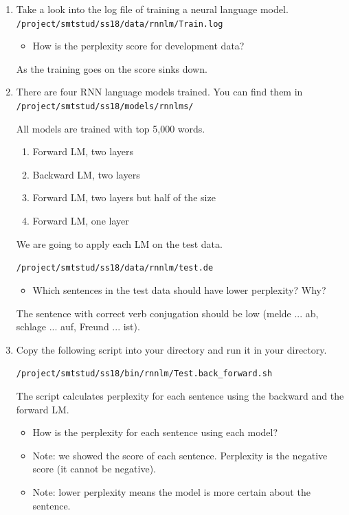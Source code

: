\documentclass[12pt,fleqn]{article}
\begin{document}
\begin{enumerate} 

\item Take a look into the log file of training a neural language model. \\ 
\texttt{/project/smtstud/ss18/data/rnnlm/Train.log} \\ 

\begin{itemize} 
 \item How is the perplexity score for development data? 
\end{itemize}

As the training goes on the score sinks down. 

\item There are four RNN language models trained. You can find them in \\ 
\texttt{/project/smtstud/ss18/models/rnnlms/} 

All models are trained with top 5,000 words. 
\begin{enumerate} 
 \item Forward LM, two layers 
 \item Backward LM, two layers 
 \item Forward LM, two layers but half of the size  
 \item Forward LM, one layer 
\end{enumerate}

We are going to apply each LM on the test data. 

\texttt{/project/smtstud/ss18/data/rnnlm/test.de} \\ 

\begin{itemize} 
 \item Which sentences in the test data should have lower perplexity? Why? 
\end{itemize}

The sentence with correct verb conjugation should be low (melde ... ab, schlage ... auf, Freund ... ist). 

\newpage 

\item Copy the following script into your directory and run it in your directory. 

\texttt{/project/smtstud/ss18/bin/rnnlm/Test.back\_forward.sh} 

The script calculates perplexity for each sentence using the backward and the forward LM. 

\begin{itemize} 
 \item How is the perplexity for each sentence using each model? 
 \item Note: we showed the score of each sentence. Perplexity is the negative score (it cannot be negative). 
 \item Note: lower perplexity means the model is more certain about the sentence. 
\end{itemize}



\end{enumerate}
\end{document}

